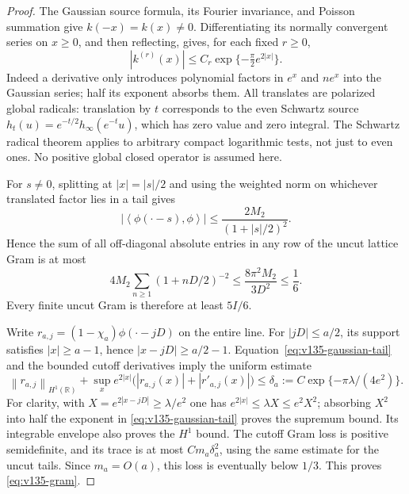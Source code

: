 \documentclass[11pt]{article}
\theoremstyle{remark}
\newcommand{\norm}[1]{\left\lVert #1\right\rVert}
\newcommand{\ip}[2]{\left\langle #1,#2\right\rangle}
\begin{document}
\begin{proof}
The Gaussian source formula, its Fourier invariance, and Poisson
summation give $k(-x)=k(x)\ne0$.  Differentiating its normally
convergent series on $x\ge0$, and then reflecting, gives, for each
fixed $r\ge0$,
\begin{equation}\label{eq:v135-gaussian-tail}
 |k^{(r)}(x)|\le C_r\exp\{-\tfrac\pi2 e^{2|x|}\}.
\end{equation}
Indeed a derivative only introduces polynomial factors in $e^x$ and
$ne^x$ into the Gaussian series; half its exponent absorbs them.
All translates are polarized global radicals: translation by $t$
corresponds to the even Schwartz source
$h_t(u)=e^{-t/2}h_\infty(e^{-t}u)$, which has zero value and zero
integral.  The Schwartz radical theorem applies to arbitrary compact
logarithmic tests, not just to even ones.  No positive global closed
operator is assumed here.

For $s\ne0$, splitting at $|x|=|s|/2$ and using the weighted norm
on whichever translated factor lies in a tail gives
\[
 |\ip{\phi(\cdot-s)}\phi|
 \le\frac{2M_2}{(1+|s|/2)^2}.
\]
Hence the sum of all off-diagonal absolute entries in any row of
the uncut lattice Gram is at most
\[
 4M_2\sum_{n\ge1}(1+nD/2)^{-2}
 \le\frac{8\pi^2M_2}{3D^2}\le\frac16.
\]
Every finite uncut Gram is therefore at least $5I/6$.

Write $r_{a,j}=(1-\chi_a)\phi(\cdot-jD)$ on the entire line.
For $|jD|\le a/2$, its support satisfies $|x|\ge a-1$, hence
$|x-jD|\ge a/2-1$.  Equation~\eqref{eq:v135-gaussian-tail} and
the bounded cutoff derivatives imply the uniform estimate
\begin{equation}\label{eq:v135-weighted-tail}
 \norm{r_{a,j}}_{H^1(\mathbb R)}+
 \sup_x e^{2|x|}\bigl(|r_{a,j}(x)|+|r'_{a,j}(x)|\bigr)
 \le\delta_a:=C\exp\{-\pi\lambda/(4e^2)\}.
\end{equation}
For clarity, with $X=e^{2|x-jD|}\ge\lambda/e^2$ one has
$e^{2|x|}\le\lambda X\le e^2X^2$; absorbing $X^2$ into half
the exponent in \eqref{eq:v135-gaussian-tail} proves the supremum
bound.  Its integrable envelope also proves the $H^1$ bound.
The cutoff Gram loss is positive semidefinite, and its trace is
at most $Cm_a\delta_a^2$, using the same estimate for the
uncut tails.  Since $m_a=O(a)$, this loss is eventually below $1/3$.
This proves \eqref{eq:v135-gram}.


\end{proof}
\end{document}
